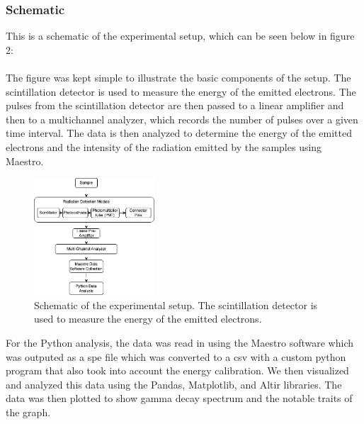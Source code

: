 \documentclass[12pt]{article}
\begin{document}
                        
                \subsubsection{Schematic}
                        This is a schematic of the experimental setup, which can be seen below in figure 2: \\ \\
                        
                        
                        The figure was kept simple to illustrate the basic components of the setup. 
                        The scintillation detector is used to measure the energy of the emitted electrons. 
                        The pulses from the scintillation detector are then passed to a linear amplifier and then 
                        to a multichannel analyzer, which records the number of pulses over a given time interval. 
                        The data is then analyzed to determine the energy of the emitted electrons and the intensity 
                        of the radiation emitted by the samples using Maestro.

                        \begin{figure}[htb!]
                                \centering
                                \includegraphics[width=0.4\textwidth]{./img/other/Lab2 Apparatus.drawio.png}
                                \caption{Schematic of the experimental setup. The scintillation detector is used to measure the energy of the emitted electrons.}
                                \label{fig:Schematic of the experimental setup. The scintillation detector is used to measure the energy of the emitted electrons.}
                        \end{figure}

                        For the Python analysis, the data was read in using the Maestro software which was outputed as a 
                        spe file which was converted to a csv with a custom python program that also took into account 
                        the energy calibration. We then visualized and analyzed this data using the Pandas, Matplotlib, and Altir libraries. 
                        The data was then plotted to show gamma decay spectrum and the notable traits of the graph.
\end{document}

